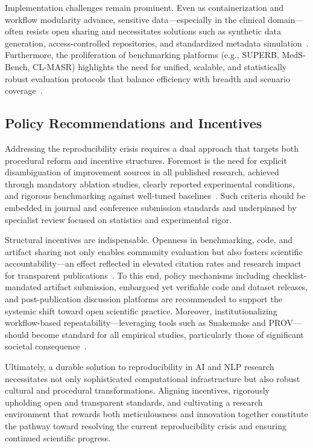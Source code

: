 \documentclass[sigconf]{acmart}
\begin{document}
Implementation challenges remain prominent. Even as containerization and workflow modularity advance, sensitive data---especially in the clinical domain---often resists open sharing and necessitates solutions such as synthetic data generation, access-controlled repositories, and standardized metadata simulation~\cite{ref108}. Furthermore, the proliferation of benchmarking platforms (e.g., SUPERB, MedS-Bench, CL-MASR) highlights the need for unified, scalable, and statistically robust evaluation protocols that balance efficiency with breadth and scenario coverage~\cite{ref94,ref95,ref106}.

\subsection{Policy Recommendations and Incentives}

Addressing the reproducibility crisis requires a dual approach that targets both procedural reform and incentive structures. Foremost is the need for explicit disambiguation of improvement sources in all published research, achieved through mandatory ablation studies, clearly reported experimental conditions, and rigorous benchmarking against well-tuned baselines~\cite{ref107,ref108}. Such criteria should be embedded in journal and conference submission standards and underpinned by specialist review focused on statistics and experimental rigor.

Structural incentives are indispensable. Openness in benchmarking, code, and artifact sharing not only enables community evaluation but also fosters scientific accountability---an effect reflected in elevated citation rates and research impact for transparent publications~\cite{ref94,ref95,ref106,ref108}. To this end, policy mechanisms including checklist-mandated artifact submission, embargoed yet verifiable code and dataset releases, and post-publication discussion platforms are recommended to support the systemic shift toward open scientific practice. Moreover, institutionalizing workflow-based repeatability---leveraging tools such as Snakemake and PROV---should become standard for all empirical studies, particularly those of significant societal consequence~\cite{ref12,ref13,ref24,ref25,ref28,ref29,ref32,ref33,ref34,ref39,ref44,ref46,ref50,ref58,ref65,ref66,ref67,ref71,ref81,ref82,ref87,ref92,ref93,ref94,ref95,ref101,ref102,ref104,ref105,ref106,ref107,ref108}.

Ultimately, a durable solution to reproducibility in AI and NLP research necessitates not only sophisticated computational infrastructure but also robust cultural and procedural transformations. Aligning incentives, rigorously upholding open and transparent standards, and cultivating a research environment that rewards both meticulousness and innovation together constitute the pathway toward resolving the current reproducibility crisis and ensuring continued scientific progress.
\end{document}
